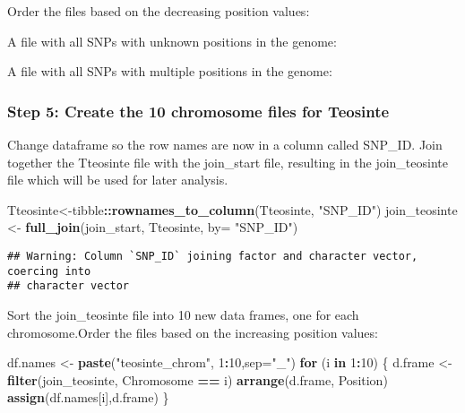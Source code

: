 \documentclass[]{article}
\newenvironment{Shaded}{\begin{snugshade}}{\end{snugshade}}
\newcommand{\ControlFlowTok}[1]{\textcolor[rgb]{0.13,0.29,0.53}{\textbf{#1}}}
\newcommand{\DataTypeTok}[1]{\textcolor[rgb]{0.13,0.29,0.53}{#1}}
\newcommand{\DecValTok}[1]{\textcolor[rgb]{0.00,0.00,0.81}{#1}}
\newcommand{\KeywordTok}[1]{\textcolor[rgb]{0.13,0.29,0.53}{\textbf{#1}}}
\newcommand{\NormalTok}[1]{#1}
\newcommand{\OperatorTok}[1]{\textcolor[rgb]{0.81,0.36,0.00}{\textbf{#1}}}
\newcommand{\StringTok}[1]{\textcolor[rgb]{0.31,0.60,0.02}{#1}}
\begin{document}
Order the files based on the decreasing position values:

A file with all SNPs with unknown positions in the genome:

A file with all SNPs with multiple positions in the genome:

\hypertarget{step-5-create-the-10-chromosome-files-for-teosinte}{%
\subsubsection{Step 5: Create the 10 chromosome files for
Teosinte}\label{step-5-create-the-10-chromosome-files-for-teosinte}}

Change dataframe so the row names are now in a column called SNP\_ID.
Join together the Tteosinte file with the join\_start file, resulting in
the join\_teosinte file which will be used for later analysis.

\begin{Shaded}
\begin{Highlighting}[]
\NormalTok{Tteosinte<-tibble}\OperatorTok{::}\KeywordTok{rownames_to_column}\NormalTok{(Tteosinte, }\StringTok{"SNP_ID"}\NormalTok{) }
\NormalTok{join_teosinte <-}\StringTok{ }\KeywordTok{full_join}\NormalTok{(join_start, Tteosinte, }\DataTypeTok{by=} \StringTok{"SNP_ID"}\NormalTok{)}
\end{Highlighting}
\end{Shaded}

\begin{verbatim}
## Warning: Column `SNP_ID` joining factor and character vector, coercing into
## character vector
\end{verbatim}

Sort the join\_teosinte file into 10 new data frames, one for each
chromosome.Order the files based on the increasing position values:

\begin{Shaded}
\begin{Highlighting}[]
\NormalTok{df.names <-}\StringTok{ }\KeywordTok{paste}\NormalTok{(}\StringTok{"teosinte_chrom"}\NormalTok{, }\DecValTok{1}\OperatorTok{:}\DecValTok{10}\NormalTok{,}\DataTypeTok{sep=}\StringTok{"_"}\NormalTok{)}
\ControlFlowTok{for}\NormalTok{ (i }\ControlFlowTok{in} \DecValTok{1}\OperatorTok{:}\DecValTok{10}\NormalTok{) \{}
\NormalTok{  d.frame <-}\StringTok{ }\KeywordTok{filter}\NormalTok{(join_teosinte, Chromosome }\OperatorTok{==}\StringTok{ }\NormalTok{i)}
  \KeywordTok{arrange}\NormalTok{(d.frame, Position)    }
  \KeywordTok{assign}\NormalTok{(df.names[i],d.frame)}
\NormalTok{\}}
\end{Highlighting}
\end{Shaded}
\end{document}
